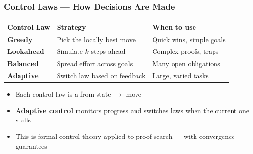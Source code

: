 \begin{frame}
\frametitle{Control Laws --- How Decisions Are Made}
\begin{center}
\small
\begin{tabular}{@{} l l l @{}}
  \toprule
  \textbf{Control Law} & \textbf{Strategy} & \textbf{When to use} \\
  \midrule
  \textbf{Greedy}      & Pick the locally best move   & Quick wins, simple goals \\
  \textbf{Lookahead}   & Simulate $k$ steps ahead     & Complex proofs, traps \\
  \textbf{Balanced}     & Spread effort across goals   & Many open obligations \\
  \textbf{Adaptive}    & Switch law based on feedback  & Large, varied tasks \\
  \bottomrule
\end{tabular}
\end{center}
\vfill
\begin{itemize}
  \item Each control law is a  from
        state $\to$ move
  \item \textbf{Adaptive control} monitors progress and switches laws
        when the current one stalls
  \item This is formal control theory applied to proof search ---
        with convergence guarantees
\end{itemize}
\end{frame}

